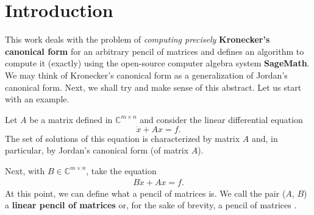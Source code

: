 \section{Introduction}
This work deals with the problem of \textit{computing precisely} \textbf{Kronecker's canonical form} for an
arbitrary pencil of matrices and defines an algorithm \linebreak to compute it (exactly) using the open-source
computer algebra system \textbf{SageMath}\cite{sage}. We may think of Kronecker's canonical form as a generalization of
Jordan's canonical form. Next, we shall try and make sense of this abstract. Let us start with an example.

Let $A$ be a matrix defined in $\mathbb{C}^{m \times n}$ and consider the linear differential equation
\[
	\dot{x} + Ax = f.
\]
The set of solutions of this equation is characterized by matrix $A$ and, in particular, by Jordan's canonical form
(of matrix $A$).

Next, with $B \in \mathbb{C}^{m \times n}$, take the equation
\begin{gather} \label{intro:1}
	B\dot{x} + Ax = f.
\end{gather}
At this point, we can define what a pencil of matrices is. We call the pair ($A$, $B$) a \textbf{linear pencil
of matrices} or, for the sake of brevity, a pencil of matrices \cite{ikramov}.


